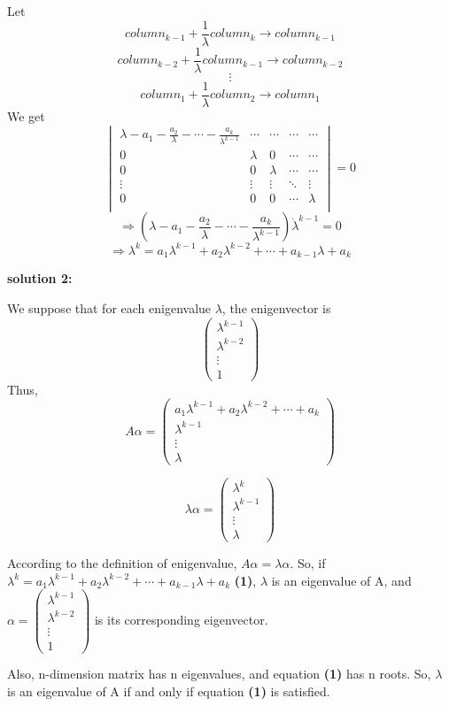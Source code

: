 \documentclass{article} %
\begin{document}
	Let
	$$ column_{k-1} + \frac{1}{\lambda} column_k \rightarrow column_{k-1}$$
	$$column_{k-2} +\frac{1}{\lambda} column_{k-1} \rightarrow column_{k-2}$$
	$$\vdots$$
	$$column_1+\frac{1}{\lambda}column_2 \rightarrow column_1$$
	We get
	$$
 \begin{vmatrix}
   \lambda -a_1-\frac{a_2}{\lambda}-\cdots - \frac{a_k}{\lambda ^{k-1}} & \cdots & \cdots & \cdots & \cdots  \\
   0 & \lambda & 0 & \cdots & \cdots \\
   0 & 0 & \lambda & \cdots & \cdots \\
   \vdots & \vdots & \vdots & \ddots & \vdots \\
   0 & 0 & 0 & \cdots & \lambda \\
  \end{vmatrix}=0
$$
$$\Rightarrow (\lambda -a_1-\frac{a_2}{\lambda}-\cdots - \frac{a_k}{\lambda ^{k-1}})\dot \lambda^{k-1}=0$$
$$\Rightarrow \lambda^{k}=a_1 \lambda^{k-1}+a_2 \lambda^{k-2}+\cdots + a_{k-1}\lambda +a_k $$

\textbf{solution 2:}\par
We suppose that for each enigenvalue $\lambda$, the enigenvector is
$$\begin{pmatrix}
\lambda^{k-1}\\
\lambda^{k-2}\\
\vdots\\
1
\end{pmatrix}
$$
Thus,$$
A\alpha = \begin{pmatrix}
a_1 \lambda^{k-1}+a_2\lambda^{k-2}+\cdots +a_k\\
\lambda^{k-1}\\
\vdots\\
\lambda
\end{pmatrix}
$$

$$\lambda \alpha = \begin{pmatrix}
\lambda^{k}\\
\lambda^{k-1}\\
\vdots\\
\lambda
\end{pmatrix}$$

According to the definition of enigenvalue, $A\alpha =\lambda \alpha$. So, if $\lambda^{k}=a_1 \lambda^{k-1}+a_2 \lambda^{k-2}+\cdots + a_{k-1}\lambda +a_k$  \textbf{(1)}, $\lambda$ is an eigenvalue of A, and
$\alpha= \begin{pmatrix}
\lambda^{k-1}\\
\lambda^{k-2}\\
\vdots\\
1
\end{pmatrix}
$ is its corresponding eigenvector.\par
Also, n-dimension matrix has n eigenvalues, and equation \textbf{(1)} has n roots. So, $\lambda$ is an eigenvalue of A if and only if equation \textbf{(1)} is satisfied.
\end{document}
